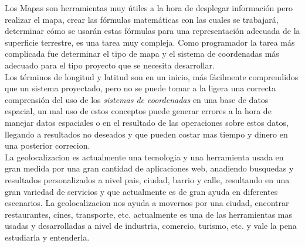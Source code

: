 
    Los Mapas son herramientas muy útiles a la hora de desplegar información pero realizar el mapa, crear las fórmulas matemáticas con las cuales se trabajará, determinar cómo se usarán estas fórmulas para una representación adecuada de la superficie terrestre, es una tarea muy compleja. Como programador la tarea más complicada fue determinar el tipo de mapa y el sistema de coordenadas más adecuado para el tipo proyecto que se necesita desarrollar.\\

    Los términos de longitud y latitud son en un inicio, más fácilmente comprendidos que un sistema proyectado, pero no se puede tomar a la ligera una correcta comprensión del uso de los \emph{sistemas de coordenadas} en una base de datos espacial, un mal uso de estos conceptos puede generar errores a la hora de manejar datos  espaciales o en el resultado de las operaciones sobre estos  datos, llegando a resultados no deseados y que pueden costar mas tiempo y dinero en una posterior correcion.\\

    La geolocalizacion es actualmente una tecnologia y una herramienta usada en gran medida por una gran cantidad de aplicaciones web, anadiendo busquedas y resultados personalizados a nivel pais, ciudad, barrio y calle, resultando en una gran variedad de servicios y que actualmente es de gran ayuda en diferentes escenarios. La geolocalizacion nos ayuda a movernos por una ciudad, encontrar restaurantes, cines, transporte, etc. actualmente es una de las herramientas mas usadas y desarrolladas a nivel de industria, comercio, turismo, etc. y vale la pena estudiarla y entenderla.\\












